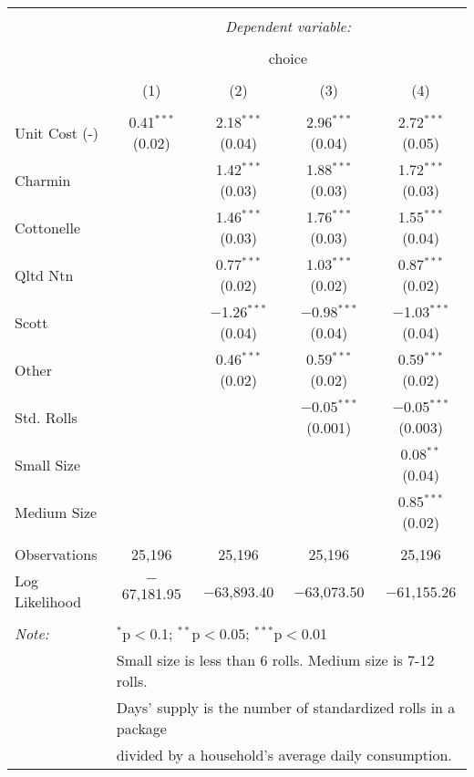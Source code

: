 
\begin{table}[!htbp] \centering 
  \caption{} 
  \label{tab:mnlDenverBaseline} 
\begin{tabular}{@{\extracolsep{5pt}}lcccc} 
\\[-1.8ex]\hline 
\hline \\[-1.8ex] 
 & \multicolumn{4}{c}{\textit{Dependent variable:}} \\ 
\cline{2-5} 
\\[-1.8ex] & \multicolumn{4}{c}{choice} \\ 
\\[-1.8ex] & (1) & (2) & (3) & (4)\\ 
\hline \\[-1.8ex] 
 Unit Cost (-) & 0.41$^{***}$ (0.02) & 2.18$^{***}$ (0.04) & 2.96$^{***}$ (0.04) & 2.72$^{***}$ (0.05) \\ 
  Charmin &  & 1.42$^{***}$ (0.03) & 1.88$^{***}$ (0.03) & 1.72$^{***}$ (0.03) \\ 
  Cottonelle &  & 1.46$^{***}$ (0.03) & 1.76$^{***}$ (0.03) & 1.55$^{***}$ (0.04) \\ 
  Qltd Ntn &  & 0.77$^{***}$ (0.02) & 1.03$^{***}$ (0.02) & 0.87$^{***}$ (0.02) \\ 
  Scott &  & $-$1.26$^{***}$ (0.04) & $-$0.98$^{***}$ (0.04) & $-$1.03$^{***}$ (0.04) \\ 
  Other &  & 0.46$^{***}$ (0.02) & 0.59$^{***}$ (0.02) & 0.59$^{***}$ (0.02) \\ 
  Std. Rolls &  &  & $-$0.05$^{***}$ (0.001) & $-$0.05$^{***}$ (0.003) \\ 
  Small Size &  &  &  & 0.08$^{**}$ (0.04) \\ 
  Medium Size &  &  &  & 0.85$^{***}$ (0.02) \\ 
 \hline \\[-1.8ex] 
Observations & 25,196 & 25,196 & 25,196 & 25,196 \\ 
Log Likelihood & $-$67,181.95 & $-$63,893.40 & $-$63,073.50 & $-$61,155.26 \\ 
\hline 
\hline \\[-1.8ex] 
\textit{Note:}  & \multicolumn{4}{l}{$^{*}$p$<$0.1; $^{**}$p$<$0.05; $^{***}$p$<$0.01} \\ 
 & \multicolumn{4}{l}{Small size is less than 6 rolls. Medium size is 7-12 rolls. } \\ 
 & \multicolumn{4}{l}{Days' supply is the number of standardized rolls in a package} \\ 
 & \multicolumn{4}{l}{divided by a household's average daily consumption.} \\ 
\end{tabular} 
\end{table} 
